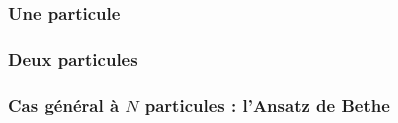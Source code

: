 \subsubsection{Une particule}
\subsubsection{Deux particules}
\subsubsection{Cas général à \(N\) particules : l'Ansatz de Bethe}


